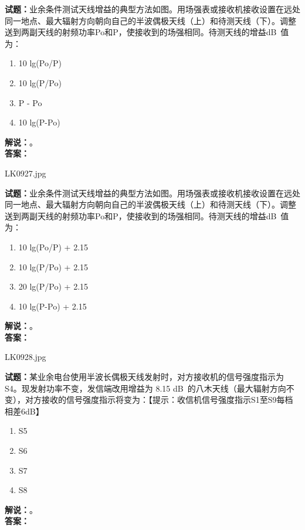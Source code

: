 \documentclass{ctexbook}
\begin{document}
\bigskip




\noindent\textbf{试题：}业余条件测试天线增益的典型方法如图。用场强表或接收机接收设置在远处同一地点、最大辐射方向朝向自己的半波偶极天线（上）和待测天线（下）。调整送到两副天线的射频功率Po和P，使接收到的场强相同。待测天线的增益\unit[qualifier-mode=combine]{\deci\bel{}}值为：
\begin{enumerate}[leftmargin=3em]
\item 10 lg(Po/P)
\item 10 lg(P/Po)
\item P - Po
\item 10 lg(P-Po)
\end{enumerate}
\noindent\textbf{解说：}\textbf{}。\\\noindent\textbf{答案：}

\bigskip

LK0927.jpg


\noindent\textbf{试题：}业余条件测试天线增益的典型方法如图。用场强表或接收机接收设置在远处同一地点、最大辐射方向朝向自己的半波偶极天线（上）和待测天线（下）。调整送到两副天线的射频功率Po和P，使接收到的场强相同。待测天线的增益\unit[qualifier-mode=combine]{\deci\bel{}}值为：
\begin{enumerate}[leftmargin=3em]
\item 10 lg(Po/P) + 2.15
\item 10 lg(P/Po) + 2.15
\item 20 lg(P/Po) + 2.15
\item 10 lg(P-Po) + 2.15
\end{enumerate}
\noindent\textbf{解说：}\textbf{}。\\\noindent\textbf{答案：}

\bigskip

LK0928.jpg


\noindent\textbf{试题：}某业余电台使用半波长偶极天线发射时，对方接收机的信号强度指示为S4。现发射功率不变，发信端改用增益为 8.15 \unit[qualifier-mode=combine]{\deci\bel{}}的八木天线（最大辐射方向不变），对方接收的信号强度指示将变为：【提示：收信机信号强度指示S1至S9每档相差6dB】
\begin{enumerate}[leftmargin=3em]
\item S5
\item S6
\item S7
\item S8
\end{enumerate}
\noindent\textbf{解说：}\textbf{}。\\\noindent\textbf{答案：}
\end{document}
